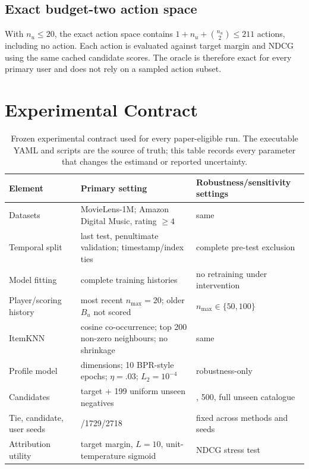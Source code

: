 \documentclass[a4paper,fleqn,doubleblind]{cas-sc}
\begin{document}
\subsection{Exact budget-two action space}
With $n_u\le20$, the exact action space contains $1+n_u+\binom{n_u}{2}\le211$ actions, including no action. Each action is evaluated against target margin and NDCG using the same cached candidate scores. The oracle is therefore exact for every primary user and does not rely on a sampled action subset.

\FloatBarrier
\clearpage
\section{Experimental Contract}\label{app:contract}
\setcounter{table}{0}

\begin{table}[!htbp]
\centering\scriptsize
\setlength{\tabcolsep}{3pt}
\caption{Frozen experimental contract used for every paper-eligible run. The executable YAML and scripts are the source of truth; this table records every parameter that changes the estimand or reported uncertainty.}
\label{tab:app-contract}
\begin{tabular}{@{}>{\raggedright\arraybackslash}p{}>{\raggedright\arraybackslash}p{}>{\raggedright\arraybackslash}p{}@{}}
\toprule
Element & Primary setting & Robustness/sensitivity settings\\
\midrule
Datasets & MovieLens-1M; Amazon Digital Music, rating $\ge4$ & same\\
Temporal split & last test, penultimate validation; timestamp/index ties & complete pre-test exclusion\\
Model fitting & complete training histories & no retraining under intervention\\
Player/scoring history & most recent $n_{\max}=20$; older $B_u$ not scored & $n_{\max}\in\{50,100\}$\\
ItemKNN & cosine co-occurrence; top 200 non-zero neighbours; no shrinkage & same\\
Profile model & 64 dimensions; 10 BPR-style epochs; $\eta=.03$; $L_2=10^{-4}$ & robustness-only\\
Candidates & target + 199 uniform unseen negatives & 100, 500, full unseen catalogue\\
Tie, candidate, user seeds & 31415/1729/2718 & fixed across methods and seeds\\
Attribution utility & target margin, $L=10$, unit-temperature sigmoid & NDCG stress test\\

\end{tabular}
\end{table}
\end{document}
